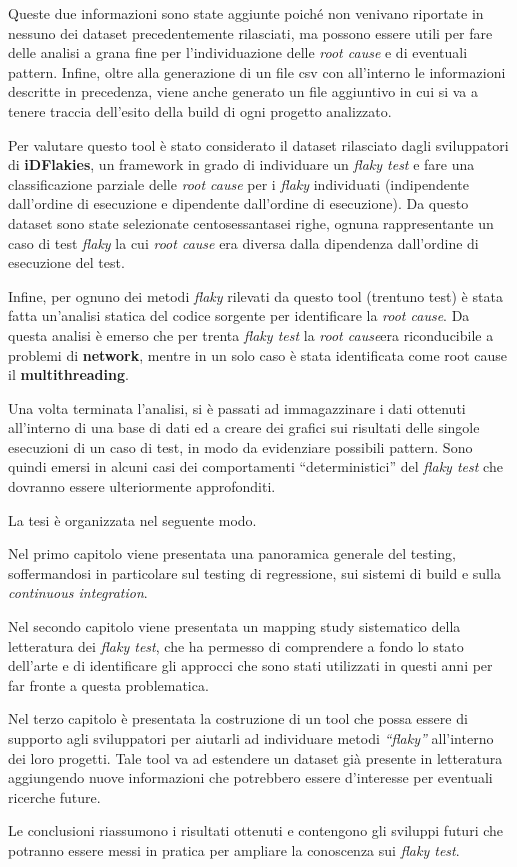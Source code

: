 Queste due informazioni sono state aggiunte poiché non venivano riportate in nessuno dei dataset precedentemente rilasciati, ma possono essere utili per fare delle analisi a grana fine per l'individuazione delle \emph{root cause} e di eventuali pattern.
Infine, oltre alla generazione di un file csv con all’interno le informazioni descritte in precedenza, viene anche generato un file aggiuntivo in cui si va a tenere traccia dell’esito della build di ogni progetto analizzato.

Per valutare questo tool è stato considerato il dataset rilasciato dagli
sviluppatori di \textbf{iDFlakies}, un framework in grado di individuare un \emph{flaky test} e fare
una classificazione parziale delle \emph{root cause} per i \emph{flaky} individuati (indipendente
dall’ordine di esecuzione e dipendente dall’ordine di esecuzione). Da questo dataset sono state selezionate centosessantasei righe, ognuna rappresentante un caso di test
\emph{flaky} la cui \emph{root cause} era diversa dalla dipendenza dall’ordine di esecuzione del
test.

Infine, per ognuno dei metodi \emph{flaky} rilevati da questo tool (trentuno test) è stata fatta un'analisi statica del codice sorgente per identificare la \emph{root cause}. Da questa analisi è emerso che per trenta \emph{flaky test} la \emph{root cause}era riconducibile a problemi di \textbf{network}, mentre in un solo caso è stata identificata come root cause il \textbf{multithreading}.

Una volta terminata l’analisi, si è passati ad immagazzinare i dati ottenuti
all’interno di una base di dati ed a creare dei grafici sui risultati delle singole
esecuzioni di un caso di test, in modo da evidenziare possibili pattern. Sono quindi
emersi in alcuni casi dei comportamenti “deterministici” del \emph{flaky test } che dovranno essere ulteriormente approfonditi.

La tesi è organizzata nel seguente modo.

Nel primo capitolo viene presentata una panoramica generale del testing, soffermandosi in particolare sul testing di regressione, sui sistemi di build e sulla \emph{continuous integration}.

Nel secondo capitolo viene presentata un mapping study sistematico della letteratura dei \emph{flaky test}, che ha permesso di comprendere a fondo lo stato dell’arte e di identificare gli approcci che sono stati utilizzati in questi anni per far fronte a
questa problematica.

Nel terzo capitolo è presentata la costruzione di un tool che possa essere di supporto agli sviluppatori per aiutarli ad individuare metodi \emph{“flaky”} all’interno dei loro progetti. Tale tool va ad estendere un dataset già presente in letteratura
aggiungendo nuove informazioni che potrebbero essere d’interesse per eventuali ricerche future.

Le conclusioni riassumono i risultati ottenuti e contengono gli sviluppi futuri che potranno essere messi in pratica per ampliare la conoscenza sui \emph{flaky test}.
